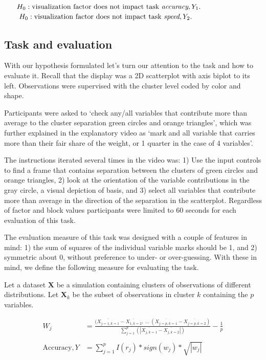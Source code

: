 \documentclass{template/monashthesis}
\begin{document}
\(~~~~~H_0: \text{visualization factor does not impact task } \textit{accuracy}, Y_1. \\\)
\(~~~~~~H_0: \text{visualization factor does not impact task } \textit{speed}, Y_2. \\\)

\hypertarget{sec:task}{%
\subsection{Task and evaluation}\label{sec:task}}

With our hypothesis formulated let's turn our attention to the task and how to evaluate it.
Recall that the display was a 2D scatterplot with axis biplot to its left. Observations were supervised with the cluster level coded by color and shape.

Participants were asked to `check any/all variables that contribute more than average to the cluster separation green circles and orange triangles', which was further explained in the explanatory video as `mark and all variable that carries more than their fair share of the weight, or 1 quarter in the case of 4 variables'.

The instructions iterated several times in the video was: 1) Use the input controls to find a frame that contains separation between the clusters of green circles and orange triangles, 2) look at the orientation of the variable contributions in the gray circle, a visual depiction of basis, and 3) select all variables that contribute more than average in the direction of the separation in the scatterplot. Regardless of factor and block values participants were limited to 60 seconds for each evaluation of this task.

The evaluation measure of this task was designed with a couple of features in mind: 1) the sum of squares of the individual variable marks should be 1, and 2) symmetric about 0, without preference to under- or over-guessing. With these in mind, we define the following measure for evaluating the task.

Let a dataset \(\textbf{X}\) be a simulation containing clusters of observations of different distributions. Let \(\textbf{X}_k\) be the subset of observations in cluster \(k\) containing the \(p\) variables.

\begin{align*}
W_{j} &=\frac
{(\overline{X_{j=1, k=1}} - \overline{X_{1, k=2}}, ~...~
(\overline{X_{j=p, k=1}} - \overline{X_{j=p, k=2}})}
{\sum_{j=1}^{p}(|\overline{X_{j,k=1}} - \overline{X_{j,k=2}}|)}
- \frac{1}{p} \\
\\
\text{Accuracy}, Y &= \sum_{j=1}^{p}I(r_j) * sign(w_j) * \sqrt{|w_j|}  \\
\end{align*}
\end{document}
